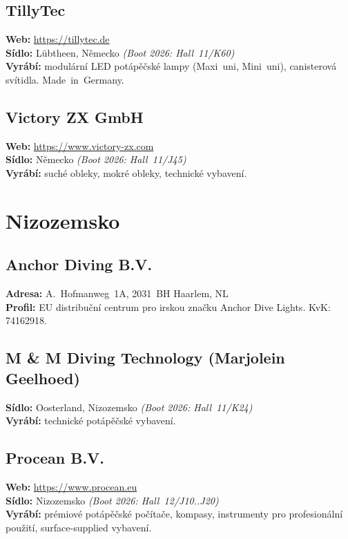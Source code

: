 \documentclass[11pt,a4paper]{article}
\begin{document}
\subsection{TillyTec}
\textbf{Web:} \url{https://tillytec.de} \\
\textbf{Sídlo:} Lübtheen, Německo \quad\emph{(Boot 2026: Hall~11/K60)} \\
\textbf{Vyrábí:} modulární LED potápěčské lampy (Maxi~uni, Mini~uni), canisterová svítidla. Made~in~Germany.

\subsection{Victory ZX GmbH}
\textbf{Web:} \url{https://www.victory-zx.com} \\
\textbf{Sídlo:} Německo \quad\emph{(Boot 2026: Hall~11/J45)} \\
\textbf{Vyrábí:} suché obleky, mokré obleky, technické vybavení.

\section{Nizozemsko}

\subsection{Anchor Diving B.V.}
\textbf{Adresa:} A.~Hofmanweg~1A, 2031~BH Haarlem, NL \\
\textbf{Profil:} EU distribuční centrum pro irskou značku Anchor Dive Lights. KvK: 74162918.

\subsection{M \& M Diving Technology (Marjolein Geelhoed)}
\textbf{Sídlo:} Oosterland, Nizozemsko \quad\emph{(Boot 2026: Hall~11/K24)} \\
\textbf{Vyrábí:} technické potápěčské vybavení.

\subsection{Procean B.V.}
\textbf{Web:} \url{https://www.procean.eu} \\
\textbf{Sídlo:} Nizozemsko \quad\emph{(Boot 2026: Hall~12/J10..J20)} \\
\textbf{Vyrábí:} prémiové potápěčské počítače, kompasy, instrumenty pro profesionální použití, surface-supplied vybavení.
\end{document}
